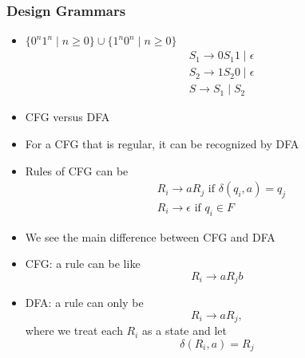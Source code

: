 \begin{frame}[allowframebreaks]
\begin{itemize}
\end{itemize}\end{frame} \begin{frame}[allowframebreaks] \frametitle{Design Grammars}
  \begin{itemize}
\item $\{0^n 1^n \mid n\geq 0\}
\cup \{1^n 0^n \mid n \geq 0\}$
\begin{equation*}
  \begin{split}
& S_1 \rightarrow 0 S_1 1 \mid \epsilon \\
& S_2 \rightarrow 1 S_2 0 \mid \epsilon \\
& S \rightarrow S_1 \mid S_2
\end{split}
\end{equation*}
\item CFG versus DFA
\item [] For a CFG that is regular, it can be recognized
by DFA
\item [] Rules of CFG can be
  \begin{equation*}
    \begin{split}
&R_i \rightarrow a R_j \text{ if } \delta(q_i,a) = q_j \\
&R_i \rightarrow \epsilon \text{ if } q_i \in F
\end{split}
\end{equation*}
\item We see the main difference between CFG and DFA

  
\item [] CFG: a rule can be like
  \begin{equation*}
  R_i \rightarrow a R_j b
\end{equation*}
\item [] DFA: a rule can only be
  \begin{equation*}
  R_i \rightarrow a R_j,
\end{equation*}
where we treat each $R_i$ as a state and let
\begin{equation*}
  \delta(R_i, a) = R_j
\end{equation*}


\end{itemize}
\end{frame}
